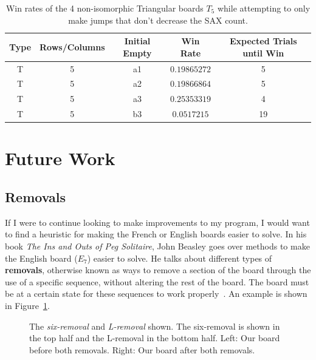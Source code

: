 \documentclass{article}
\begin{document}
\begin{table}[htb]
\begin{center} 
\begin{tabularx}{.88\textwidth}{ c  c  c  c  c }
\hline
\textbf{Type} & \textbf{Rows/Columns} &\textbf{Initial Empty} & \textbf{Win Rate} & \textbf{Expected Trials until Win}\\
\hline
T & 5 & a1 & $0.19865272$ & 5\\

T & 5 & a2 & $0.19866864$ & 5\\

T & 5 & a3 & $0.25353319$ & 4\\

T & 5 & b3 & $0.0517215$ & 19\\

\end{tabularx}
\caption{Win rates of the 4 non-isomorphic Triangular boards $T_5$ while attempting to only make jumps that don't decrease the SAX count.}
\label{tab4}
\end{center} 
\end{table}

\section{Future Work}
\label{5FutureWork}
\subsection{Removals}
If I were to continue looking to make improvements to my program, I would want to find a heuristic for making the French or English boards easier to solve. In his book \textit{The Ins and Outs of Peg Solitaire}, John Beasley goes over methods to make the English board ($E_7$) easier to solve. He talks about different types of \textbf{removals}, otherwise known as ways to remove a section of the board through the use of a specific sequence, without altering the rest of the board. The board must be at a certain state for these sequences to work properly~\cite{Beasley}. An example is shown in Figure~\ref{fig10}.

\begin{figure}[htb]
\centering
{}
\caption{The \textit{six-removal} and \textit{L-removal} shown.  The six-removal is shown in the top half and the L-removal in the bottom half. Left:  Our board before both removals. Right: Our board after both removals.}
\label{fig10}
\end{figure}
\end{document}
